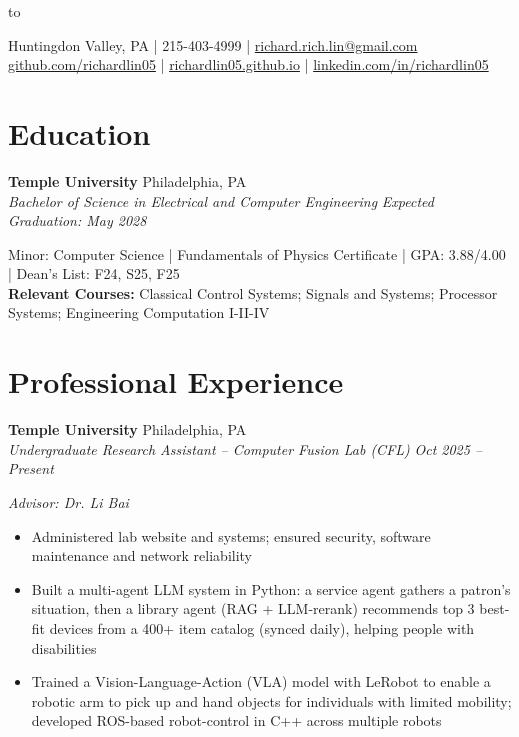 \documentclass[11pt, letterpaper]{article}
\newcommand{\roleentry}[4]{%
    \noindent\textbf{#1} \hfill #2 \\
    \textit{#3} \hfill \textit{#4}%
    \vspace{0pt}
}
\begin{document}
\noindent
\hbox to \\[-1pt]
{\centering
    Huntingdon Valley, PA | 215-403-4999 |
    \href{mailto:richard.rich.lin@gmail.com}{richard.rich.lin@gmail.com} \\
    \href{https://github.com/richardlin05}{github.com/richardlin05} |
    \href{https://richardlin05.github.io}{richardlin05.github.io} |
    \href{https://linkedin.com/in/richardlin05}{linkedin.com/in/richardlin05}
    \par}

\vspace{-2pt}

\section{Education}

\roleentry{Temple University}{Philadelphia, PA}%
    {Bachelor of Science in Electrical and Computer Engineering}{Expected Graduation: May 2028}

\noindent Minor: Computer Science | Fundamentals of Physics Certificate | GPA: 3.88/4.00 | Dean's List: F24, S25, F25 \\
\noindent \textbf{Relevant Courses:} Classical Control Systems; Signals and Systems; Processor Systems; Engineering Computation I-II-IV

\vspace{2pt}

\section{Professional Experience}

\roleentry{Temple University}{Philadelphia, PA}%
    {Undergraduate Research Assistant -- Computer Fusion Lab (CFL)}{Oct 2025 -- Present}

\noindent \textit{Advisor: Dr. Li Bai}
\begin{itemize}
    \item Administered lab website and systems; ensured security, software maintenance and network reliability
    \item Built a multi-agent LLM system in Python: a service agent gathers a patron's situation, then a library agent (RAG + LLM-rerank) recommends top 3 best-fit devices from a 400+ item catalog (synced daily), helping people with disabilities
    \item Trained a Vision-Language-Action (VLA) model with LeRobot to enable a robotic arm to pick up and hand objects for individuals with limited mobility; developed ROS-based robot-control in C++ across multiple robots
\end{itemize}
\end{document}
